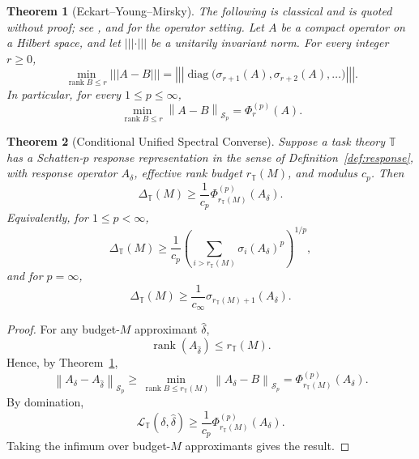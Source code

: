 \documentclass[12pt]{article}
\newtheorem{theorem}{Theorem}[section]
\theoremstyle{definition}
\DeclareMathOperator{\rank}{rank}
\newcommand{\norm}[1]{\left\lVert#1\right\rVert}
\newcommand{\vertiii}[1]{%
  \left\lvert\left\lvert\left\lvert#1\right\rvert\right\rvert\right\rvert%
}
\newcommand{\Sp}[1]{\mathcal S_{#1}}
\begin{document}
\begin{theorem}[Eckart--Young--Mirsky]
\label{thm:mirsky}
The following is classical and is quoted without proof; see
\cite{eckart1936,mirsky1960}, and \cite{peller2003} for the operator setting.
Let $A$ be a compact operator on a Hilbert space, and let
$\vertiii{\cdot}$ be a unitarily invariant norm.  For every integer $r\ge0$,
\[
\min_{\rank B\le r}
\vertiii{A-B}
=
\vertiii{
\operatorname{diag}
\bigl(
\sigma_{r+1}(A),
\sigma_{r+2}(A),
\dots
\bigr)
}.
\]
In particular, for every $1\le p\le\infty$,
\[
\min_{\rank B\le r}
\norm{A-B}_{\Sp{p}}
=
\Phi^{(p)}_r(A).
\]
\end{theorem}

\begin{theorem}[Conditional Unified Spectral Converse]
\label{thm:unified}
Suppose a task theory $\mathbb T$ has a Schatten-$p$ response representation
in the sense of Definition~\ref{def:response}, with response operator
$A_\delta$, effective rank budget $r_{\mathbb T}(M)$, and modulus $c_p$.  Then
\[
\Delta_{\mathbb T}(M)
\ge
\frac1{c_p}
\Phi^{(p)}_{r_{\mathbb T}(M)}(A_\delta).
\]
Equivalently, for $1\le p<\infty$,
\[
\Delta_{\mathbb T}(M)
\ge
\frac1{c_p}
\left(
\sum_{i>r_{\mathbb T}(M)}
\sigma_i(A_\delta)^p
\right)^{1/p},
\]
and for $p=\infty$,
\[
\Delta_{\mathbb T}(M)
\ge
\frac1{c_\infty}
\sigma_{r_{\mathbb T}(M)+1}(A_\delta).
\]
\end{theorem}

\begin{proof}
For any budget-$M$ approximant $\widehat\delta$,
\[
\rank(A_{\widehat\delta})
\le
r_{\mathbb T}(M).
\]
Hence, by Theorem~\ref{thm:mirsky},
\[
\norm{A_\delta-A_{\widehat\delta}}_{\Sp{p}}
\ge
\min_{\rank B\le r_{\mathbb T}(M)}
\norm{A_\delta-B}_{\Sp{p}}
=
\Phi^{(p)}_{r_{\mathbb T}(M)}(A_\delta).
\]
By domination,
\[
\mathcal L_{\mathbb T}(\delta,\widehat\delta)
\ge
\frac1{c_p}
\Phi^{(p)}_{r_{\mathbb T}(M)}(A_\delta).
\]
Taking the infimum over budget-$M$ approximants gives the result.
\end{proof}
\end{document}
